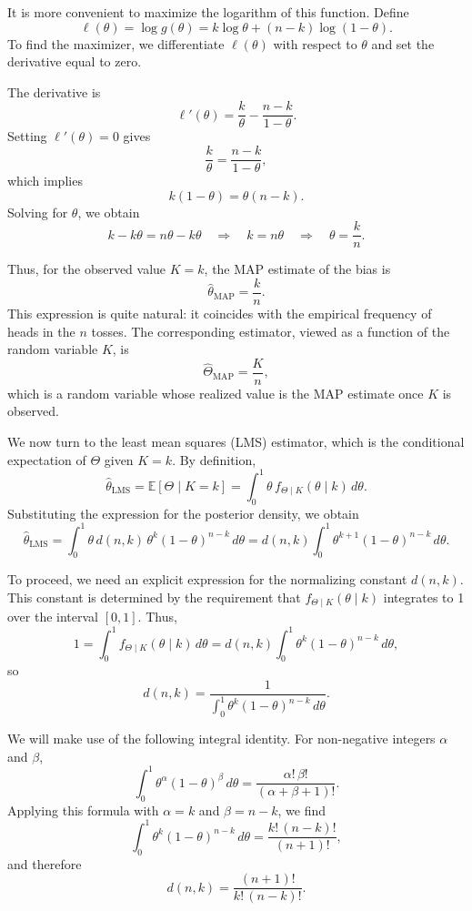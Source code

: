 It is more convenient to maximize the logarithm of this function.  
Define
\[
\ell(\theta)
=
\log g(\theta)
=
k \log \theta
+
(n-k)\log(1-\theta).
\]
To find the maximizer, we differentiate \(\ell(\theta)\) with respect to \(\theta\) and set the derivative equal to zero.  

The derivative is
\[
\ell'(\theta)
=
\frac{k}{\theta}
-
\frac{n-k}{1-\theta}.
\]
Setting \(\ell'(\theta) = 0\) gives
\[
\frac{k}{\theta}
=
\frac{n-k}{1-\theta},
\]
which implies
\[
k(1-\theta)
=
\theta(n-k).
\]
Solving for \(\theta\), we obtain
\[
k - k\theta
=
n\theta - k\theta
\quad\Rightarrow\quad
k
=
n\theta
\quad\Rightarrow\quad
\theta
=
\frac{k}{n}.
\]

Thus, for the observed value \(K = k\), the MAP estimate of the bias is
\[
\hat{\theta}_{\text{MAP}}
=
\frac{k}{n}.
\]
This expression is quite natural: it coincides with the empirical frequency of heads in the \(n\) tosses.  
The corresponding estimator, viewed as a function of the random variable \(K\), is
\[
\hat{\Theta}_{\text{MAP}}
=
\frac{K}{n},
\]
which is a random variable whose realized value is the MAP estimate once \(K\) is observed.  

We now turn to the least mean squares (LMS) estimator, which is the conditional expectation of \(\Theta\) given \(K = k\).  
By definition,
\[
\hat{\theta}_{\text{LMS}}
=
\mathbb{E}[\Theta \mid K = k]
=
\int_{0}^{1} \theta \, f_{\Theta \mid K}(\theta \mid k)\,d\theta.
\]
Substituting the expression for the posterior density, we obtain
\[
\hat{\theta}_{\text{LMS}}
=
\int_{0}^{1} \theta \, d(n,k)\,\theta^{k}(1-\theta)^{n-k}\,d\theta
=
d(n,k)
\int_{0}^{1} \theta^{k+1}(1-\theta)^{n-k}\,d\theta.
\]

To proceed, we need an explicit expression for the normalizing constant \(d(n,k)\).  
This constant is determined by the requirement that \(f_{\Theta \mid K}(\theta \mid k)\) integrates to 1 over the interval \([0,1]\).  
Thus,
\[
1
=
\int_{0}^{1} f_{\Theta \mid K}(\theta \mid k)\,d\theta
=
d(n,k)
\int_{0}^{1} \theta^{k}(1-\theta)^{n-k}\,d\theta,
\]
so
\[
d(n,k)
=
\frac{1}
{\int_{0}^{1} \theta^{k}(1-\theta)^{n-k}\,d\theta}.
\]

We will make use of the following integral identity.  
For non-negative integers \(\alpha\) and \(\beta\),
\[
\int_{0}^{1} \theta^{\alpha}(1-\theta)^{\beta}\,d\theta
=
\frac{\alpha!\,\beta!}{(\alpha + \beta + 1)!}.
\]
Applying this formula with \(\alpha = k\) and \(\beta = n-k\), we find
\[
\int_{0}^{1} \theta^{k}(1-\theta)^{n-k}\,d\theta
=
\frac{k!\,(n-k)!}{(n+1)!},
\]
and therefore
\[
d(n,k)
=
\frac{(n+1)!}{k!\,(n-k)!}.
\]


